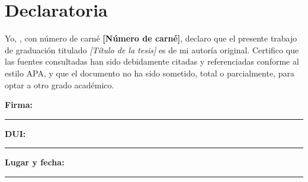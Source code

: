 \chapter*{Declaratoria}

Yo, \textbf{\UESauthori}, con número de carné \textbf{[Número de carné]}, declaro que el presente trabajo de graduación titulado \textit{[Título de la tesis]} es de mi autoría original. 
Certifico que las fuentes consultadas han sido debidamente citadas y referenciadas conforme al estilo APA, y que el documento no ha sido sometido, total o parcialmente, para optar a otro grado académico.

\vspace{0.8cm}

\noindent\textbf{Firma:} \rule{6cm}{0.4pt}\hfill \textbf{DUI:} \rule{4cm}{0.4pt}

\noindent\textbf{Lugar y fecha:} \rule{7cm}{0.4pt}

